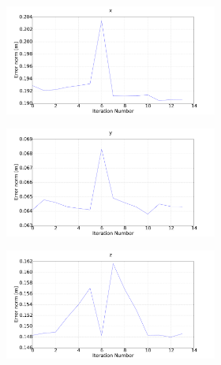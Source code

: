 \begin{figure}
  \centering
  \begin{subfigure}{0.48\textwidth}
    \begin{subfigure}{\textwidth}
      \includegraphics[clip, trim = 60 0 140 0, width=\textwidth]{figures/chapter3/err_x}
    \end{subfigure}
    \begin{subfigure}{\textwidth}
      \includegraphics[clip, trim = 60 0 140 0, width=\textwidth]{figures/chapter3/err_y}
    \end{subfigure}
    \begin{subfigure}{\textwidth}
      \includegraphics[clip, trim = 60 0 140 0, width=\textwidth]{figures/chapter3/err_z}

\end{subfigure}
\end{subfigure}
\end{figure}
